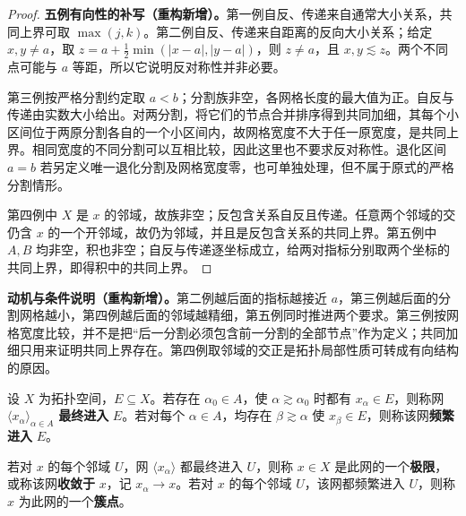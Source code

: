 \documentclass[../../main.tex]{subfiles}%
\begin{document}
\begin{proof}
\textbf{五例有向性的补写（重构新增）。}第一例自反、传递来自通常大小关系，共同上界可取 $\max(j,k)$。第二例自反、传递来自距离的反向大小关系；给定 $x,y\ne a$，取 $z=a+\tfrac12\min(|x-a|,|y-a|)$，则 $z\ne a$，且 $x,y\lesssim z$。两个不同点可能与 $a$ 等距，所以它说明反对称性并非必要。

第三例按严格分割约定取 $a<b$；分割族非空，各网格长度的最大值为正。自反与传递由实数大小给出。对两分割，将它们的节点合并排序得到共同加细，其每个小区间位于两原分割各自的一个小区间内，故网格宽度不大于任一原宽度，是共同上界。相同宽度的不同分割可以互相比较，因此这里也不要求反对称性。退化区间 $a=b$ 若另定义唯一退化分割及网格宽度零，也可单独处理，但不属于原式的严格分割情形。

第四例中 $X$ 是 $x$ 的邻域，故族非空；反包含关系自反且传递。任意两个邻域的交仍含 $x$ 的一个开邻域，故仍为邻域，并且是反包含关系的共同上界。第五例中 $A,B$ 均非空，积也非空；自反与传递逐坐标成立，给两对指标分别取两个坐标的共同上界，即得积中的共同上界。
\end{proof}
\begin{remark}
\textbf{动机与条件说明（重构新增）。}第二例越后面的指标越接近 $a$，第三例越后面的分割网格越小，第四例越后面的邻域越精细，第五例同时推进两个要求。第三例按网格宽度比较，并不是把“后一分割必须包含前一分割的全部节点”作为定义；共同加细只用来证明共同上界存在。第四例取邻域的交正是拓扑局部性质可转成有向结构的原因。
\end{remark}
\begin{definition}[最终进入与频繁进入]\label{definition:ch04-eventually-frequently}
设 $X$ 为拓扑空间，$E\subseteq X$。若存在 $\alpha_0\in A$，使 $\alpha\gtrsim\alpha_0$ 时都有 $x_\alpha\in E$，则称网 $\langle x_\alpha\rangle_{\alpha\in A}$ \textbf{最终进入} $E$。若对每个 $\alpha\in A$，均存在 $\beta\gtrsim\alpha$ 使 $x_\beta\in E$，则称该网\textbf{频繁进入} $E$。
\end{definition}
\begin{definition}[网的极限与簇点]\label{definition:ch04-net-limits-cluster}
若对 $x$ 的每个邻域 $U$，网 $\langle x_\alpha\rangle$ 都最终进入 $U$，则称 $x\in X$ 是此网的一个\textbf{极限}，或称该网\textbf{收敛于} $x$，记 $x_\alpha\to x$。若对 $x$ 的每个邻域 $U$，该网都频繁进入 $U$，则称 $x$ 为此网的一个\textbf{簇点}。
\end{definition}
\end{document}
